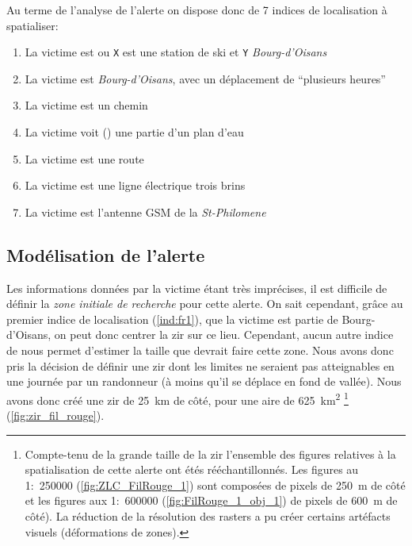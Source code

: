 Au terme de l'analyse de l'alerte on dispose donc de 7 indices de
localisation à spatialiser:
% 
\begin{enumerate}
\item \label{ind:fr1} La victime est
   ou \texttt{X} est
  une station de ski et \texttt{Y} \emph{Bourg-d'Oisans}
\item \label{ind:fr2} La victime est
   \emph{Bourg-d'Oisans}, avec un
  déplacement de \enquote{plusieurs heures}
\item \label{ind:fr3} La victime est  un
  chemin
\item \label{ind:fr4} La victime voit ()
  une partie d'un plan d'eau
\item \label{ind:fr5} La victime est  une
  route
\item \label{ind:fr6} La victime est  une
  ligne électrique trois brins
\item \label{ind:fr7} La victime est 
  l'antenne GSM de la \emph{St-Philomene}
\end{enumerate}

\subsection{Modélisation de l'alerte}
\label{subsec:9-4-2}

Les informations données par la victime étant très imprécises, il est
difficile de définir la \emph{zone initiale de recherche} pour cette
alerte. On sait cependant, grâce au premier indice de localisation
(\ref{ind:fr1}), que la victime est partie de Bourg-d'Oisans, on peut
donc centrer la \ac{zir} sur ce lieu. Cependant, aucun autre indice de
nous permet d'estimer la taille que devrait faire cette zone. Nous
avons donc pris la décision de définir une \ac{zir} dont les limites
ne seraient pas atteignables en une journée par un randonneur (à moins
qu'il se déplace en fond de vallée).
%
Nous avons donc créé une \ac{zir} de \SI{25}{\kilo\meter} de côté,
pour une aire de \SI{625}{\kilo\meter\squared} \footnote{Compte-tenu
  de la grande taille de la \ac{zir} l'ensemble des figures relatives
  à la spatialisation de cette alerte ont étés rééchantillonnés. Les
  figures au 1:~\num{250000} (\eg \autoref{fig:ZLC_FilRouge_1}) sont
  composées de pixels de \SI{250}{\meter} de côté et les figures aux
  1:~\num{600000} (\eg \autoref{fig:FilRouge_1_obj_1}) de pixels de
  \SI{600}{\meter} de côté). La réduction de la résolution des rasters
  a pu créer certains artéfacts visuels (\eg déformations de zones).}
(\autoref{fig:zir_fil_rouge}).

